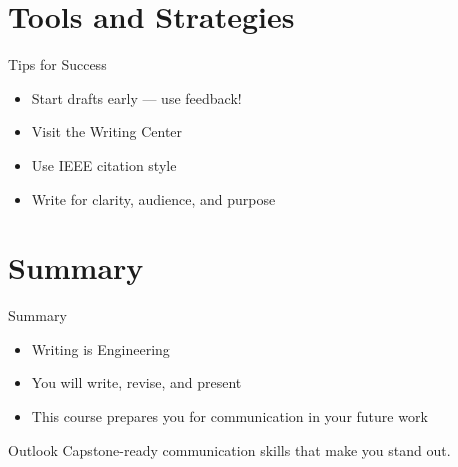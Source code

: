 \documentclass{beamer}
\begin{document}
\section{Tools and Strategies}

\begin{frame}{Tips for Success}
	\begin{itemize}
		\item Start drafts early — use feedback!
		\item Visit the Writing Center
		\item Use IEEE citation style
		\item Write for clarity, audience, and purpose
	\end{itemize}
\end{frame}

\section{Summary}

\begin{frame}{Summary}
	\begin{itemize}
		\item \alert{Writing is Engineering}
		\item \alert{You will write, revise, and present}
		\item This course prepares you for communication in your future work
	\end{itemize}
	\vfill
	\begin{block}{Outlook}
		Capstone-ready communication skills that make you stand out.
	\end{block}
\end{frame}
\end{document}
